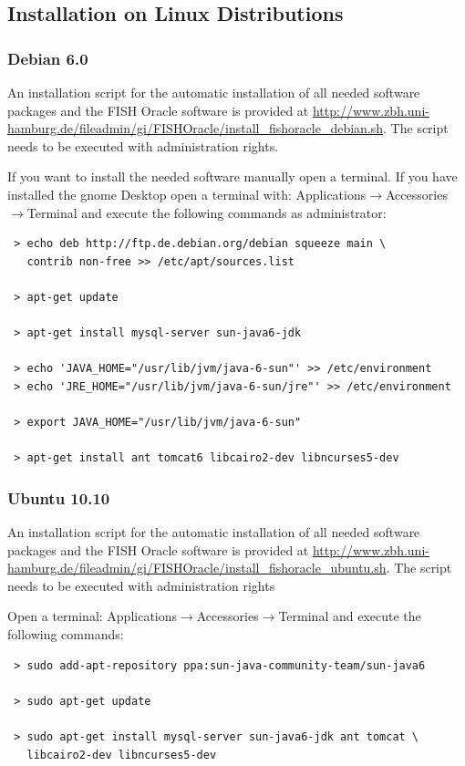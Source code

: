 \documentclass[11pt,final]{article}
\begin{document}
\subsection{Installation on Linux Distributions}

\subsubsection{Debian 6.0}

An installation script for the automatic installation of all needed software
packages and the FISH Oracle software is provided at
\url{http://www.zbh.uni-hamburg.de/fileadmin/gi/FISHOracle/install_fishoracle_debian.sh}.
The script needs to be executed with administration rights.

If you want to install the needed software manually open a terminal.
If you have installed the gnome Desktop open a terminal with:
Applications$\rightarrow$Accessories$\rightarrow$Terminal and execute the 
following commands as administrator:

\begin{lstlisting}
 > echo deb http://ftp.de.debian.org/debian squeeze main \
   contrib non-free >> /etc/apt/sources.list

 > apt-get update

 > apt-get install mysql-server sun-java6-jdk

 > echo 'JAVA_HOME="/usr/lib/jvm/java-6-sun"' >> /etc/environment
 > echo 'JRE_HOME="/usr/lib/jvm/java-6-sun/jre"' >> /etc/environment

 > export JAVA_HOME="/usr/lib/jvm/java-6-sun"

 > apt-get install ant tomcat6 libcairo2-dev libncurses5-dev
\end{lstlisting}

\subsubsection{Ubuntu 10.10}

An installation script for the automatic installation of all needed software
packages and the FISH Oracle software is provided at
\url{http://www.zbh.uni-hamburg.de/fileadmin/gi/FISHOracle/install_fishoracle_ubuntu.sh}.
The script needs to be executed with administration rights

Open a terminal: Applications$\rightarrow$Accessories$\rightarrow$Terminal and execute the 
following commands:

\begin{lstlisting}
 > sudo add-apt-repository ppa:sun-java-community-team/sun-java6

 > sudo apt-get update

 > sudo apt-get install mysql-server sun-java6-jdk ant tomcat \
   libcairo2-dev libncurses5-dev
\end{lstlisting}
\end{document}
